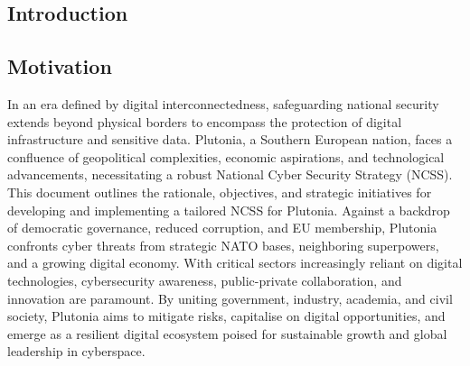 \documentclass[
	a4paper, %
	10pt, %
]{CSSullivanBusinessReport}
\begin{document}
\begin{fullwidth}
\tableofcontents
\newpage

\begin{justify}

\section{Introduction}
\subsection{Motivation }
In an era defined by digital interconnectedness, safeguarding national security extends beyond physical borders to encompass the protection of digital infrastructure and sensitive data. Plutonia, a Southern European nation, faces a confluence of geopolitical complexities, economic aspirations, and technological advancements, necessitating a robust National Cyber Security Strategy (NCSS). This document outlines the rationale, objectives, and strategic initiatives for developing and implementing a tailored NCSS for Plutonia. Against a backdrop of democratic governance, reduced corruption, and EU membership, Plutonia confronts cyber threats from strategic NATO bases, neighboring superpowers, and a growing digital economy. With critical sectors increasingly reliant on digital technologies, cybersecurity awareness, public-private collaboration, and innovation are paramount. By uniting government, industry, academia, and civil society, Plutonia aims to mitigate risks, capitalise on digital opportunities, and emerge as a resilient digital ecosystem poised for sustainable growth and global leadership in cyberspace.


\end{justify}
\end{fullwidth}
\end{document}
